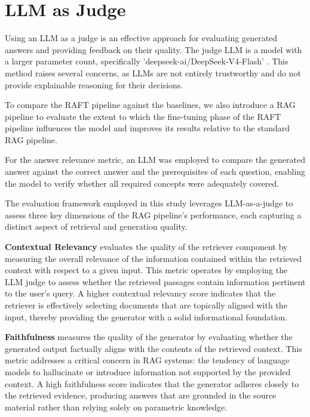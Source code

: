 \section{LLM as Judge}


Using an LLM as a judge is an effective approach for evaluating generated answers and providing feedback on their quality.
The judge LLM is a model with a larger parameter count, specifically 'deepseek-ai/DeepSeek-V4-Flash' \cite{deepseekai2026deepseekv4}.
This method raises several concerns, as LLMs are not entirely trustworthy
and do not provide explainable reasoning for their decisions.

To compare the RAFT pipeline against the baselines, we also introduce a RAG pipeline to evaluate the extent to which the fine-tuning phase of the RAFT pipeline influences the model and improves its results relative to the standard RAG pipeline.

For the answer relevance metric, an LLM was employed to compare the generated answer against the correct answer
and the prerequisites of each question, enabling the model to verify whether all required concepts were adequately covered.

The evaluation framework employed in this study leverages LLM-as-a-judge to assess three key dimensions of the RAG pipeline's performance, each capturing a distinct aspect of retrieval and generation quality.

\textbf{Contextual Relevancy} evaluates the quality of the retriever component by measuring the overall relevance of the information contained within the retrieved context with respect to a given input. This metric operates by employing the LLM judge to assess whether the retrieved passages contain information pertinent to the user's query. A higher contextual relevancy score indicates that the retriever is effectively selecting documents that are topically aligned with the input, thereby providing the generator with a solid informational foundation.

\textbf{Faithfulness} measures the quality of the generator by evaluating whether the generated output factually aligns with the contents of the retrieved context. This metric addresses a critical concern in RAG systems: the tendency of language models to hallucinate or introduce information not supported by the provided context. A high faithfulness score indicates that the generator adheres closely to the retrieved evidence, producing answers that are grounded in the source material rather than relying solely on parametric knowledge.

